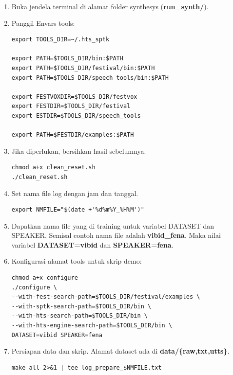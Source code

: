 \documentclass[12pt,]{article}
\begin{document}
	\begin{enumerate}
		\item Buka jendela terminal di alamat folder synthesys (\textbf{run\_synth/}).
		
		\item Panggil Envars tools:
		\begin{verbatim}
export TOOLS_DIR=~/.hts_sptk

export PATH=$TOOLS_DIR/bin:$PATH
export PATH=$TOOLS_DIR/festival/bin:$PATH
export PATH=$TOOLS_DIR/speech_tools/bin:$PATH

export FESTVOXDIR=$TOOLS_DIR/festvox
export FESTDIR=$TOOLS_DIR/festival
export ESTDIR=$TOOLS_DIR/speech_tools

export PATH=$FESTDIR/examples:$PATH
		\end{verbatim}

		\item Jika diperlukan, bersihkan hasil sebelumnya.
		\begin{verbatim}
chmod a+x clean_reset.sh
./clean_reset.sh
		\end{verbatim}
		
		\item Set nama file log dengan jam dan tanggal.
		\begin{verbatim}
export NMFILE="$(date +'%d%m%Y_%H%M')"
		\end{verbatim}
		
		\item Dapatkan nama file yang di training untuk variabel DATASET dan SPEAKER.
		Semisal contoh nama file adalah \textbf{vibid\_fena}.
		Maka nilai variabel \textbf{DATASET=vibid} dan \textbf{SPEAKER=fena}.
		
		\item Konfigurasi alamat tools untuk skrip demo:
		\begin{verbatim}
chmod a+x configure
./configure \
--with-fest-search-path=$TOOLS_DIR/festival/examples \
--with-sptk-search-path=$TOOLS_DIR/bin \
--with-hts-search-path=$TOOLS_DIR/bin \
--with-hts-engine-search-path=$TOOLS_DIR/bin \
DATASET=vibid SPEAKER=fena
		\end{verbatim}
		
		\item Persiapan data dan skrip.
		Alamat dataset ada di \textbf{data/\{raw,txt,utts\}}.
		\begin{verbatim}
make all 2>&1 | tee log_prepare_$NMFILE.txt
		\end{verbatim}
		

\end{enumerate}
\end{document}
